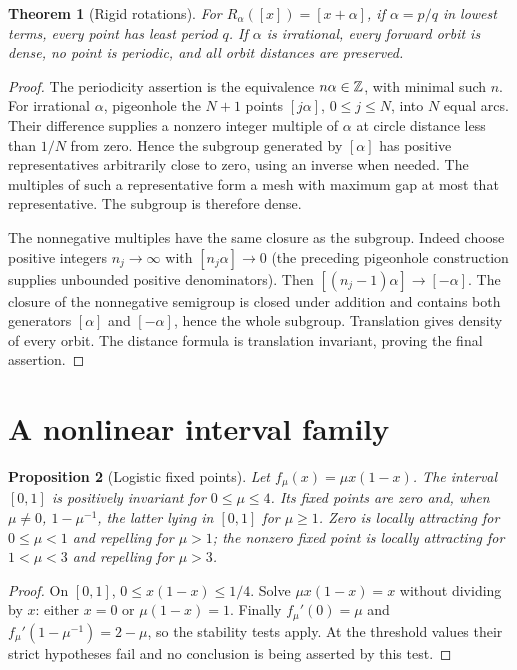 \documentclass[11pt,oneside]{book}
\newtheorem{theorem}{Theorem}[chapter]
\newtheorem{proposition}[theorem]{Proposition}
\theoremstyle{definition}
\theoremstyle{remark}\newtheorem{remark}[theorem]{Remark}
\begin{document}
\begin{theorem}[Rigid rotations]\label{d13:15:rigid-rotation}
For \(R_\alpha([x])=[x+\alpha]\), if \(\alpha=p/q\) in lowest terms,
every point has least period \(q\). If \(\alpha\) is irrational, every
forward orbit is dense, no point is periodic, and all orbit distances
are preserved.
\end{theorem}
\begin{proof}
The periodicity assertion is the equivalence
\(n\alpha\in\mathbb Z\), with minimal such \(n\). For irrational \(\alpha\),
pigeonhole the \(N+1\) points \([j\alpha]\), \(0\leq j\leq N\), into
\(N\) equal arcs. Their difference supplies a nonzero integer multiple
of \(\alpha\) at circle distance less than \(1/N\) from zero.
Hence the subgroup generated by \([\alpha]\) has positive representatives
arbitrarily close to zero, using an inverse when needed. The multiples
of such a representative form a mesh with maximum gap at most that
representative. The subgroup is therefore dense.

The nonnegative multiples have the same closure as the subgroup.
Indeed choose positive integers \(n_j\to\infty\) with
\([n_j\alpha]\to0\) (the preceding pigeonhole construction supplies
unbounded positive denominators). Then
\([(n_j-1)\alpha]\to[-\alpha]\). The closure of the nonnegative
semigroup is closed under addition and contains both generators
\([\alpha]\) and \([-\alpha]\), hence the whole subgroup. Translation
gives density of every orbit. The distance formula is translation
invariant, proving the final assertion.
\end{proof}

\section{A nonlinear interval family}

\begin{proposition}[Logistic fixed points]\label{d13:15:logistic-fixed-points}
Let \(f_\mu(x)=\mu x(1-x)\). The interval \([0,1]\) is positively
invariant for \(0\leq\mu\leq4\). Its fixed points are zero and, when
\(\mu\neq0\), \(1-\mu^{-1}\), the latter lying in \([0,1]\) for
\(\mu\geq1\). Zero is locally attracting for \(0\leq\mu<1\) and
repelling for \(\mu>1\); the nonzero fixed point is locally attracting
for \(1<\mu<3\) and repelling for \(\mu>3\).
\end{proposition}
\begin{proof}
On \([0,1]\), \(0\leq x(1-x)\leq1/4\). Solve
\(\mu x(1-x)=x\) without dividing by \(x\): either \(x=0\) or
\(\mu(1-x)=1\). Finally \(f_\mu'(0)=\mu\) and
\(f_\mu'(1-\mu^{-1})=2-\mu\), so the stability tests apply.
At the threshold values their strict hypotheses fail and no conclusion
is being asserted by this test.
\end{proof}
\end{document}
